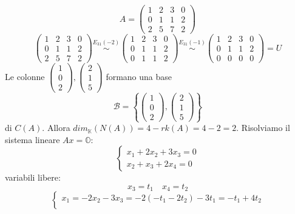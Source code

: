 \documentclass[a4paper]{article}
\theoremstyle{break}
\theoremstyle{break}
\theoremstyle{break}
\theoremstyle{break}
\begin{document}
\begin{example}
  \[
  A = \begin{pmatrix} 
    1 & 2 & 3 & 0\\
    0 & 1 & 1 & 2\\
    2 & 5 & 7 & 2
  \end{pmatrix} 
  \] 
  \[
  \begin{pmatrix} 
    1 & 2 & 3 & 0\\
    0 & 1 & 1 & 2\\
    2 & 5 & 7 & 2
  \end{pmatrix} 
  \stackrel{E_{31}(-2)}{\sim}
  \begin{pmatrix} 
    1 & 2 & 3 & 0\\
    0 & 1 & 1 & 2\\
    0 & 1 & 1 & 2
  \end{pmatrix} 
  \stackrel{E_{31}(-1)}{\sim}
  \begin{pmatrix} 
    1 & 2 & 3 & 0\\
    0 & 1 & 1 & 2\\
    0 & 0 & 0 & 0
  \end{pmatrix} 
  = U
  \] 
  Le colonne \( \begin{pmatrix} 1\\0\\2 \end{pmatrix}, \begin{pmatrix} 2\\1\\5 \end{pmatrix} \) 
  formano una base
  \[
  \mathcal{B} = \left\{ \begin{pmatrix} 1\\0\\2 \end{pmatrix},
    \begin{pmatrix} 2\\1\\5 \end{pmatrix} 
  \right\} 
  \] 
  di \( C(A) \).
  Allora \( dim_{\mathbb{K}}(N(A)) = 4 - rk(A) = 4 - 2 = 2\). Risolviamo il sistema 
  lineare \( Ax = \mathbb{O} \):
  \[
  \begin{cases}
    x_1 +2x_2 +3x_3 =0\\
        x_2 +x_3 +2x_4 =0
  \end{cases}
  \] 
  variabili libere:
  \[
  x_3 = t_1 \quad x_4 = t_2
  \] 
  \[
  \begin{cases}
    x_1 = -2x_2 - 3x_3 = -2(-t_1-2t_2)-3t_1 = -t_1 + 4t_2\\

\end{cases}\]
\end{example}
\end{document}
